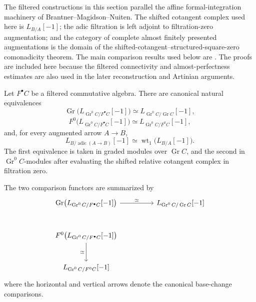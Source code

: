\begin{remark}
\label{rem:bmn-formal-integration-comparison}
The filtered constructions in this section parallel the affine formal-integration
machinery of Brantner--Magidson--Nuiten. The shifted cotangent complex used
here is \(L_{B/A}[-1]\); the adic filtration is left adjoint to filtration-zero
augmentation; and the category of complete almost finitely presented augmentations is the domain of the
shifted-cotangent--structured-square-zero comonadicity theorem. The main comparison results used
below are
\cite[
    Remark~2.10,
    Lemma~2.12,
    Proposition~2.14,
    Lemma~2.16,
    Proposition~2.18,
    and Theorem~2.25
]{BrantnerMagidsonNuiten}.
The proofs are included here because the filtered connectivity and
almost-perfectness estimates are also used in the later reconstruction and
Artinian arguments.
\end{remark}


\begin{lemma}
\label{lem:cotangent-graded-adic-compatibility}
Let \(F^\bullet C\) be a filtered commutative algebra. There are canonical
natural equivalences
\[
    \operatorname{Gr}
    \bigl(
        L_{\operatorname{Gr}^0C/F^\bullet C}[-1]
    \bigr)
    \simeq
    L_{\operatorname{Gr}^0C/\operatorname{Gr}C}[-1],
\]
\[
    F^0
    \bigl(
        L_{\operatorname{Gr}^0C/F^\bullet C}[-1]
    \bigr)
    \simeq
    L_{\operatorname{Gr}^0C/F^0C}[-1],
\]
and, for every augmented arrow \(A\to B\),
\[
    L_{B/\operatorname{adic}(A\to B)}[-1]
    \simeq
    \operatorname{wt}_1\bigl(L_{B/A}[-1]\bigr).
\]
The first equivalence is taken in graded modules over
\(\operatorname{Gr}C\), and the second in
\(\operatorname{Gr}^0C\)-modules after evaluating the shifted relative
cotangent complex in filtration zero.

The two comparison functors are summarized by
\[
\begin{tikzcd}[column sep=huge,row sep=large]
    \operatorname{Gr}
    \bigl(L_{\operatorname{Gr}^0C/F^\bullet C}[-1]\bigr)
        \arrow[r,"\simeq"]
        &
    L_{\operatorname{Gr}^0C/\operatorname{Gr}C}[-1]
    \\
    F^0\bigl(L_{\operatorname{Gr}^0C/F^\bullet C}[-1]\bigr)
        \arrow[d,"\simeq"']
        &
    \\
    L_{\operatorname{Gr}^0C/F^0C}[-1]
        &
\end{tikzcd}
\]
where the horizontal and vertical arrows denote the canonical base-change
comparisons.
\end{lemma}

